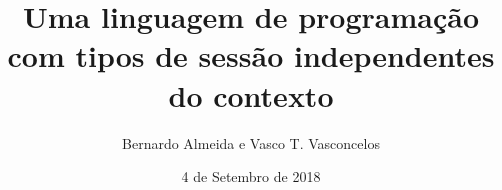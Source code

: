 \documentclass[unknownkeysallowed]{beamer}
\title[Uma linguagem com tipos de sessão independentes do contexto]{Uma linguagem de programação com tipos de
sessão independentes do contexto}
\author{Bernardo Almeida e Vasco T. Vasconcelos}
\institute{LASIGE, Faculdade de Ciências, Universidade de Lisboa}
\date{4 de Setembro de 2018}
\begin{document}
\begin{frame}
  \titlepage
\end{frame}



%

\end{document}
